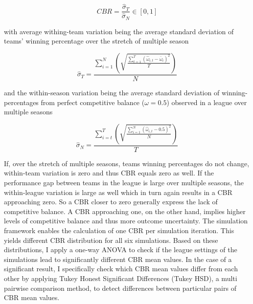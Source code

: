 \documentclass[12pt, a4paper]{article}
\begin{document}
\begin{equation}
CBR = \frac{\hat{\sigma}_T}{\hat{\sigma}_N}\in [0,1]
\end{equation}

\noindent
with average withing-team variation being the average standard deviation of teams' winning percentage over the stretch of multiple season

\begin{equation}
\hat{\sigma}_T = \frac{\sum_{i=1}^N(\sqrt{\frac{\sum_{t=1}^T{(\hat{\omega}_{i,t}-\bar{\omega}_{i})^2}}{T}})}{N}
\end{equation}

\noindent
and the within-season variation being the average standard deviation of winning-percentages from perfect competitive balance ($\omega=0.5$) observed in a league over multiple seasons

\begin{equation}
\hat{\sigma}_N = \frac{\sum_{i=t}^T(\sqrt{\frac{\sum_{i=1}^N{(\hat{\omega}_{i,t}-0.5)^2}}{N}})}{T}
\end{equation}

\noindent
If, over the stretch of multiple seasons, teams winning percentages do not change, within-team variation is zero and thus CBR equals zero as well. If the performance gap between teams in the league is large over multiple seasons, the within-league variation is large as well which in turn again results in a CBR approaching zero. So a CBR closer to zero generally express the lack of competitive balance. A CBR approaching one, on the other hand, implies higher levels of competitive balance and thus more outcome uncertainty. The simulation framework enables the calculation of one CBR per simulation iteration. This yields different CBR distribution for all six simulations. Based on these distributions, I apply a one-way ANOVA to check if the league settings of the simulations lead to significantly different CBR mean values. In the case of a significant result, I specifically check which CBR mean values differ from each other by applying Tukey Honest Significant Differences (Tukey HSD), a multi pairwise comparison method, to detect differences between particular pairs of CBR mean values. 
\end{document}
